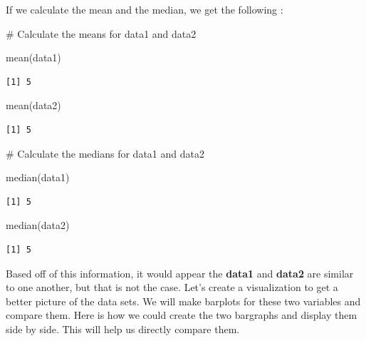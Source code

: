\documentclass[
  letterpaper,
  DIV=11,
  numbers=noendperiod]{scrreprt}
\newenvironment{Shaded}{\begin{snugshade}}{\end{snugshade}}
\newcommand{\CommentTok}[1]{\textcolor[rgb]{0.37,0.37,0.37}{#1}}
\newcommand{\FunctionTok}[1]{\textcolor[rgb]{0.28,0.35,0.67}{#1}}
\newcommand{\NormalTok}[1]{\textcolor[rgb]{0.00,0.23,0.31}{#1}}
\begin{document}
If we calculate the mean and the median, we get the following :

\begin{Shaded}
\begin{Highlighting}[]
\CommentTok{\# Calculate the means for data1 and data2}

\FunctionTok{mean}\NormalTok{(data1)}
\end{Highlighting}
\end{Shaded}

\begin{verbatim}
[1] 5
\end{verbatim}

\begin{Shaded}
\begin{Highlighting}[]
\FunctionTok{mean}\NormalTok{(data2)}
\end{Highlighting}
\end{Shaded}

\begin{verbatim}
[1] 5
\end{verbatim}

\begin{Shaded}
\begin{Highlighting}[]
\CommentTok{\# Calculate the medians for data1 and data2}

\FunctionTok{median}\NormalTok{(data1)}
\end{Highlighting}
\end{Shaded}

\begin{verbatim}
[1] 5
\end{verbatim}

\begin{Shaded}
\begin{Highlighting}[]
\FunctionTok{median}\NormalTok{(data2)}
\end{Highlighting}
\end{Shaded}

\begin{verbatim}
[1] 5
\end{verbatim}

Based off of this information, it would appear the \textbf{data1} and
\textbf{data2} are similar to one another, but that is not the case.
Let's create a visualization to get a better picture of the data sets.
We will make barplots for these two variables and compare them. Here is
how we could create the two bargraphs and display them side by side.
This will help us directly compare them.
\end{document}
